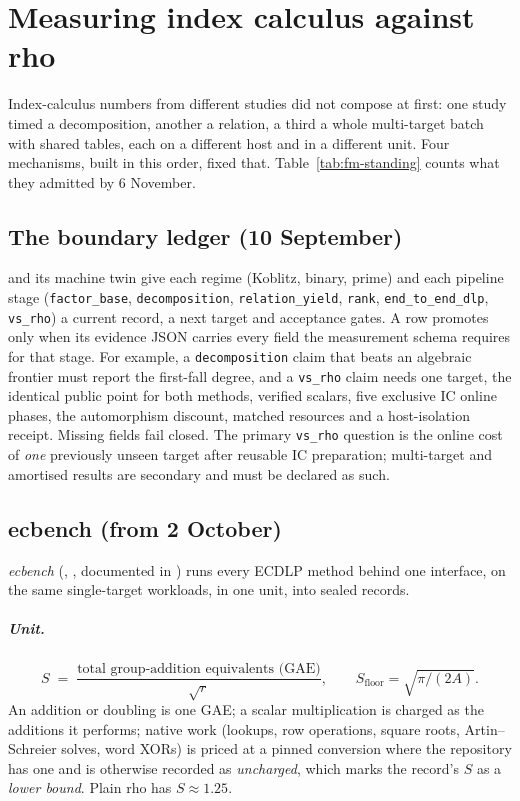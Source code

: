 \chapter{Measuring index calculus against rho}\label{sec:method}

Index-calculus numbers from different studies did not compose at first:
one study timed a decomposition, another a relation, a third a whole
multi-target batch with shared tables, each on a different host and in a
different unit. Four mechanisms, built in this order, fixed that.
Table~\ref{tab:fm-standing} counts what they admitted by 6 November.

\section{The boundary ledger (10 September)}

 and its machine twin
 give each regime (Koblitz, binary,
prime) and each pipeline stage (\texttt{factor\_base},
\texttt{decomposition}, \texttt{relation\_yield}, \texttt{rank},
\texttt{end\_to\_end\_dlp}, \texttt{vs\_rho}) a current record, a next
target and acceptance gates. A row promotes only when its evidence JSON
carries every field the measurement schema requires for that stage. For
example, a \texttt{decomposition} claim that beats an algebraic frontier
must report the first-fall degree, and a \texttt{vs\_rho} claim needs one
target, the identical public point for both methods, verified scalars,
five exclusive IC online phases, the automorphism discount, matched
resources and a host-isolation receipt. Missing fields fail closed. The
primary \texttt{vs\_rho} question is the online cost of \emph{one}
previously unseen target after reusable IC preparation; multi-target and
amortised results are secondary and must be declared as such.

\section{ecbench (from 2 October)}\label{sec:ecbench}

\emph{ecbench} (, ,
documented in ) runs every ECDLP method behind
one interface, on the same single-target workloads, in one unit, into
sealed records.

\paragraph{Unit.}
\[
  S \;=\; \frac{\text{total group-addition equivalents (GAE)}}{\sqrt r},
  \qquad
  S_{\text{floor}}=\sqrt{\pi/(2A)}.
\]
An addition or doubling is one GAE; a scalar multiplication is charged as
the additions it performs; native work (lookups, row operations, square
roots, Artin--Schreier solves, word XORs) is priced at a pinned conversion
where the repository has one and is otherwise recorded as
\emph{uncharged}, which marks the record's $S$ as a \emph{lower bound}.
Plain rho has $S\approx1.25$.

